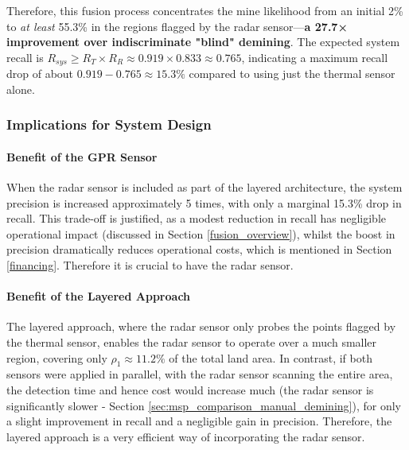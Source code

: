         Therefore, this fusion process concentrates the mine likelihood from an initial 2\% to \textit{at least} 55.3\% in the regions flagged by the radar sensor—\textbf{a  27.7× improvement over indiscriminate "blind" demining}. The expected system recall is $R_{sys} \geq R_T \times R_R \approx 0.919 \times 0.833 \approx 0.765$, indicating a maximum recall drop of about $0.919 - 0.765 \approx 15.3\%$ compared to using just the thermal sensor alone.


    \subsubsection{Implications for System Design}

        \paragraph{Benefit of the GPR Sensor}
        
            
            When the radar sensor is included as part of the layered architecture, the system precision is increased approximately 5 times, with only a marginal 15.3\% drop in recall. This trade-off is justified, as a modest reduction in recall has negligible operational impact (discussed in Section \ref{fusion_overview}), whilst the boost in precision dramatically reduces operational costs, which is mentioned in Section \ref{financing}. Therefore it is crucial to have the radar sensor.
                
        \paragraph{Benefit of the Layered Approach} \label{Benefit of the Layered Approach}
        
            The layered approach, where the radar sensor only probes the points flagged by the thermal sensor, enables the radar sensor to operate over a much smaller region, covering only $\rho_1 \approx 11.2\%$ of the total land area. In contrast, if both sensors were applied in parallel, with the radar sensor scanning the entire area, the detection time and hence cost would increase much (the radar sensor is significantly slower - Section \ref{sec:msp_comparison_manual_demining}), for only a slight improvement in recall and a negligible gain in precision. Therefore, the layered approach is a very efficient way of incorporating the radar sensor. 

            

        